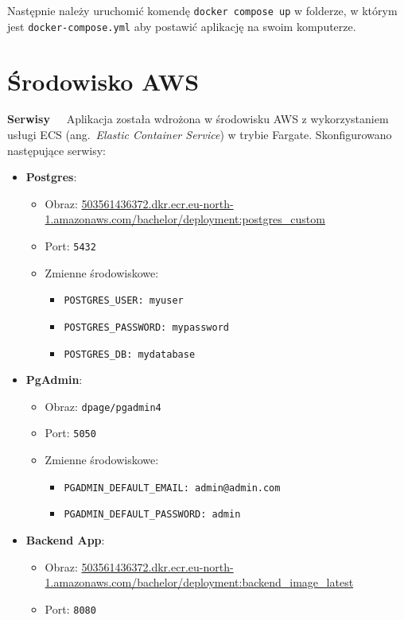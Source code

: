 Następnie należy uruchomić komendę \texttt{docker compose up} w folderze, w którym jest \texttt{docker-compose.yml} aby postawić aplikację na swoim komputerze.

\section{Środowisko AWS}
\textbf{Serwisy~~}
Aplikacja została wdrożona w środowisku AWS z wykorzystaniem usługi ECS (ang.~\emph{Elastic Container Service}) w trybie Fargate. Skonfigurowano następujące serwisy:
\begin{itemize}
    \item \textbf{Postgres}:
    \begin{itemize}
        \item Obraz: \url{503561436372.dkr.ecr.eu-north-1.amazonaws.com/bachelor/deployment:postgres_custom}
        \item Port: \texttt{5432}
        \item Zmienne środowiskowe:
        \begin{itemize}
            \item \texttt{POSTGRES\_USER: myuser}
            \item \texttt{POSTGRES\_PASSWORD: mypassword}
            \item \texttt{POSTGRES\_DB: mydatabase}
        \end{itemize}
    \end{itemize}
    \item \textbf{PgAdmin}:
    \begin{itemize}
        \item Obraz: \texttt{dpage/pgadmin4}
        \item Port: \texttt{5050}
        \item Zmienne środowiskowe:
        \begin{itemize}
            \item \texttt{PGADMIN\_DEFAULT\_EMAIL: admin@admin.com}
            \item \texttt{PGADMIN\_DEFAULT\_PASSWORD: admin}
        \end{itemize}
    \end{itemize}
    \item \textbf{Backend App}:
    \begin{itemize}
        \item Obraz: \url{503561436372.dkr.ecr.eu-north-1.amazonaws.com/bachelor/deployment:backend_image_latest}
        \item Port: \texttt{8080}

\end{itemize}
\end{itemize}
